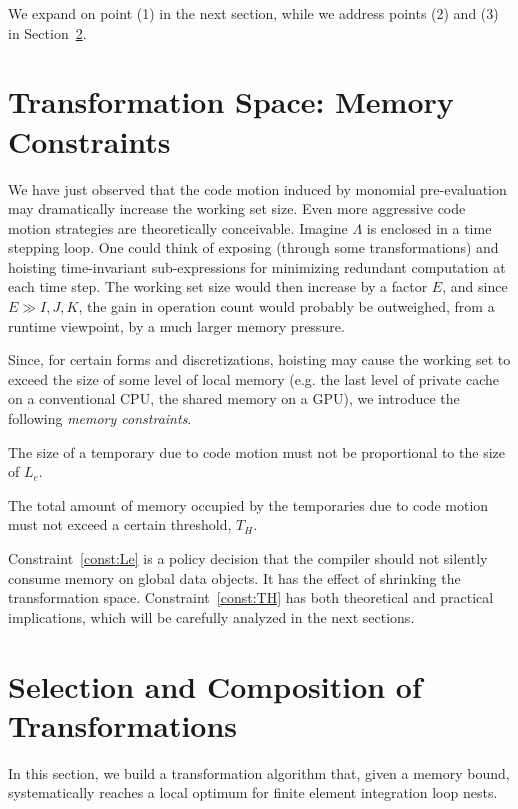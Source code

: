 We expand on point (1) in the next section, while we address points (2) and (3) in Section~\ref{sec:optimal-synthesis}. 

\section{Transformation Space: Memory Constraints}
\label{sec:mem-const}
We have just observed that the code motion induced by monomial pre-evaluation may dramatically increase the working set size. Even more aggressive code motion strategies are theoretically conceivable. Imagine $\Lambda$ is enclosed in a time stepping loop. One could think of exposing (through some transformations) and hoisting time-invariant sub-expressions for minimizing redundant computation at each time step. The working set size would then increase by a factor $E$, and since $E \gg I, J, K$, the gain in operation count would probably be outweighed, from a runtime viewpoint, by a much larger memory pressure.

Since, for certain forms and discretizations, hoisting may cause the working set to exceed the size of some level of local memory (e.g. the last level of private cache on a conventional CPU, the shared memory on a GPU), we introduce the following \textit{memory constraints}.

\begin{Const}
\label{const:Le}
The size of a temporary due to code motion must not be proportional to the size of $L_e$.
\end{Const}

\begin{Const}
\label{const:TH}
The total amount of memory occupied by the temporaries due to code motion must not exceed a certain threshold, \texttt{$T_H$}.
\end{Const}

Constraint~\ref{const:Le} is a policy decision that the compiler should not silently consume memory on global data objects. It has the effect of shrinking the transformation space. Constraint~\ref{const:TH} has both theoretical and practical implications, which will be carefully analyzed in the next sections.




\section{Selection and Composition of Transformations}
\label{sec:optimal-synthesis}
In this section, we build a transformation algorithm that, given a memory bound, systematically reaches a local optimum for finite element integration loop nests. 


